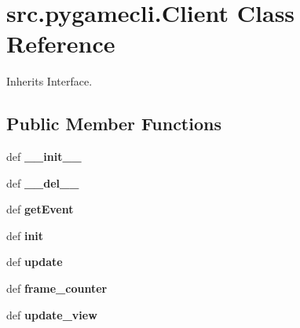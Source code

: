 \hypertarget{classsrc_1_1pygamecli_1_1_client}{\section{src.\-pygamecli.\-Client \-Class \-Reference}
\label{classsrc_1_1pygamecli_1_1_client}
}


\-Inherits \-Interface.

\subsection*{\-Public \-Member \-Functions}
\begin{DoxyCompactItemize}
\item 
\hypertarget{classsrc_1_1pygamecli_1_1_client_a5b97e1e6b122fdeaba6d9a9810b4d870}{def {\bfseries \-\_\-\-\_\-init\-\_\-\-\_\-}}\label{classsrc_1_1pygamecli_1_1_client_a5b97e1e6b122fdeaba6d9a9810b4d870}

\item 
\hypertarget{classsrc_1_1pygamecli_1_1_client_a6cf631d834c6a4854133d5509a73b759}{def {\bfseries \-\_\-\-\_\-del\-\_\-\-\_\-}}\label{classsrc_1_1pygamecli_1_1_client_a6cf631d834c6a4854133d5509a73b759}

\item 
\hypertarget{classsrc_1_1pygamecli_1_1_client_a02f5fc6dd7f31177408c81d709059f21}{def {\bfseries get\-Event}}\label{classsrc_1_1pygamecli_1_1_client_a02f5fc6dd7f31177408c81d709059f21}

\item 
\hypertarget{classsrc_1_1pygamecli_1_1_client_af1234f6de9b72873fe8e2e9d26089edf}{def {\bfseries init}}\label{classsrc_1_1pygamecli_1_1_client_af1234f6de9b72873fe8e2e9d26089edf}

\item 
\hypertarget{classsrc_1_1pygamecli_1_1_client_a4926a1006abda8a2bf9e081d1a4fc66c}{def {\bfseries update}}\label{classsrc_1_1pygamecli_1_1_client_a4926a1006abda8a2bf9e081d1a4fc66c}

\item 
\hypertarget{classsrc_1_1pygamecli_1_1_client_a0ddec8faec8c0b507d0d21c84a51d571}{def {\bfseries frame\-\_\-counter}}\label{classsrc_1_1pygamecli_1_1_client_a0ddec8faec8c0b507d0d21c84a51d571}

\item 
\hypertarget{classsrc_1_1pygamecli_1_1_client_a1d936b2150a341362934e36fcd49ff35}{def {\bfseries update\-\_\-view}}\label{classsrc_1_1pygamecli_1_1_client_a1d936b2150a341362934e36fcd49ff35}


\end{DoxyCompactItemize}
